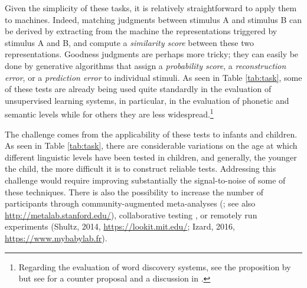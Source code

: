 \documentclass[jou,apacite]{apa6}
\begin{document}
Given the simplicity of these tasks, it is relatively straightforward to apply them to machines. Indeed, matching judgments between stimulus A and stimulus B can be derived by extracting from the machine the representations triggered by stimulus A and B, and compute a \textit{similarity score} between these two representations. Goodness judgments are perhaps more tricky; they can easily be done by generative algorithms that assign a \textit{probability score}, a \textit{reconstruction error}, or a \textit{prediction error} to individual stimuli. 
As seen in Table \ref{tab:task}, some of these tests are already being used quite standardly in the evaluation of unsupervised learning systems, in particular, in the evaluation of phonetic and semantic levels while for others they are less widespread.\footnote{Regarding the evaluation of word discovery systems, see the proposition by  but see  for a counter proposal and a discussion in .}












The challenge comes from the applicability of these tests to infants and children. As seen in Table \ref{tab:task}, there are considerable variations on the age at which different linguistic levels have been tested in children, and generally, the younger the child, the more difficult it is to construct reliable tests. %
Addressing this challenge would require improving substantially the signal-to-noise of some of these techniques. %
There is also the possibility to increase the number of participants through community-augmented meta-analyses (; see also \url{http://metalab.stanford.edu/}), collaborative testing \cite{frank_2017}, %
or remotely run experiments (Shultz, 2014, \url{https://lookit.mit.edu/}; Izard, 2016,  \url{https://www.mybabylab.fr}). 
\end{document}
